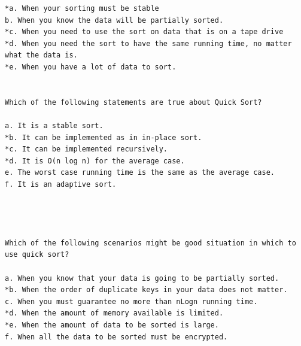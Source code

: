 \begin{verbatim}
*a. When your sorting must be stable 
b. When you know the data will be partially sorted. 
*c. When you need to use the sort on data that is on a tape drive 
*d. When you need the sort to have the same running time, no matter what the data is. 
*e. When you have a lot of data to sort. 


Which of the following statements are true about Quick Sort? 

a. It is a stable sort. 
*b. It can be implemented as in in-place sort. 
*c. It can be implemented recursively. 
*d. It is O(n log n) for the average case. 
e. The worst case running time is the same as the average case. 
f. It is an adaptive sort. 




Which of the following scenarios might be good situation in which to use quick sort? 

a. When you know that your data is going to be partially sorted. 
*b. When the order of duplicate keys in your data does not matter. 
c. When you must guarantee no more than nLogn running time. 
*d. When the amount of memory available is limited. 
*e. When the amount of data to be sorted is large. 
f. When all the data to be sorted must be encrypted. 

\end{verbatim}
